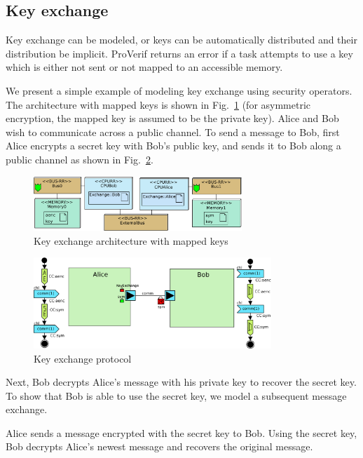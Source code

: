\documentclass{llncs}
\begin{document}
\subsection{Key exchange}


Key exchange can be modeled, or keys can be automatically distributed and their distribution be implicit. ProVerif
returns an error if a task attempts to use a key which is either not sent or not mapped to an accessible memory. 

We present a simple example of modeling key exchange using security operators.
The architecture with mapped keys is shown in Fig.~\ref{fig:keyArch} (for
asymmetric encryption, the mapped key is assumed to be the private key). Alice
and Bob wish to communicate across a public channel. To send a message to Bob, first Alice encrypts a secret key with Bob's public key, and sends it to Bob along a public channel as shown in
Fig.~\ref{fig:keyComp}.

\begin{figure}[htbp]
	\centering
 	\includegraphics[width=0.7\textwidth]{figures/securityStuff/keyArch.pdf}
	\caption{Key exchange architecture with mapped keys}
	\label{fig:keyArch}
\end{figure}


\begin{figure}[htbp]
	\centering
 	\includegraphics[width=0.8\textwidth]{figures/securityStuff/keyComp.pdf}
	\caption{Key exchange protocol}
	\label{fig:keyComp}
\end{figure}

Next, Bob decrypts Alice's message with his private key to recover the secret key. To show that Bob is able to use the
secret key, we model a subsequent message exchange. 

Alice sends a message encrypted with the secret key to Bob. Using the secret key, Bob decrypts Alice's newest message
and recovers the original message. 
\end{document}
